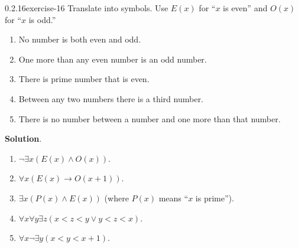 \documentclass[twoside,11pt,]{book}
\numberwithin{equation}{chapter}
\newcommand{\imp}{\rightarrow}
\newcommand{\lt}{<}
\begin{document}
\begin{divisionsolution}{0.2.16}{}{exercise-16}%
\hypertarget{p-376}{}%
Translate into symbols. Use \(E(x)\) for ``\(x\) is even'' and \(O(x)\) for ``\(x\) is odd.''\leavevmode%
\begin{enumerate}[label=(\alph*)]
\item\hypertarget{li-409}{}\hypertarget{p-377}{}%
No number is both even and odd.%
\item\hypertarget{li-410}{}\hypertarget{p-378}{}%
One more than any even number is an odd number.%
\item\hypertarget{li-411}{}\hypertarget{p-379}{}%
There is prime number that is even.%
\item\hypertarget{li-412}{}\hypertarget{p-380}{}%
Between any two numbers there is a third number.%
\item\hypertarget{li-413}{}\hypertarget{p-381}{}%
There is no number between a number and one more than that number.%
\end{enumerate}
%
\par\smallskip%
\noindent\textbf{Solution}.\quad%
\hypertarget{p-382}{}%
\leavevmode%
\begin{enumerate}[label=(\alph*)]
\item\hypertarget{li-414}{}\(\neg \exists x (E(x) \wedge O(x))\).%
\item\hypertarget{li-415}{}\(\forall x (E(x) \imp O(x+1))\).%
\item\hypertarget{li-416}{}\(\exists x(P(x) \wedge E(x))\) (where \(P(x)\) means ``\(x\) is prime'').%
\item\hypertarget{li-417}{}\(\forall x \forall y \exists z(x \lt z \lt y \vee y \lt z \lt x)\).%
\item\hypertarget{li-418}{}\(\forall x \neg \exists y (x \lt y \lt x+1)\).%
\end{enumerate}
%
\end{divisionsolution}%
\end{document}
